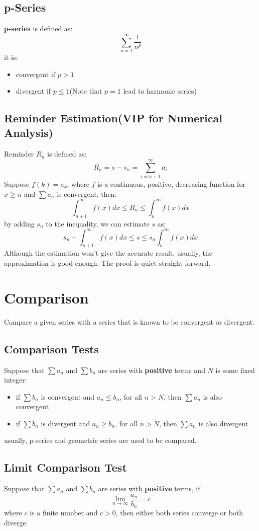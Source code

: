 \documentclass[10pt,a4paper,oneside]{article}
\begin{document}
\subsection{p-Series}
\textbf{p-series} is defined as:
\[
\sum_{n=1}^{\infty} \frac{1}{n^p}
\]
it is:
\begin{itemize}
	\item convergent if $p>1$
	\item divergent if $p \leq 1$(Note that $p=1$ lead to harmonic series)
\end{itemize}

\subsection{Reminder Estimation(VIP for Numerical Analysis)}
Reminder $R_n$ is defined as:
\[
R_n = s - s_n = \sum_{i=n+1}^{\infty} a_i
\]
Suppose $f(k) = a_k$, where  $f$ is a continuous, positive, decreasing function for $x \geq n$ and $\sum a_n$ is convergent, then:
\[
\int_{n+1}^{\infty} f(x) dx \leq R_n \leq \int_{n}^{\infty} f(x)dx
\]
by adding $s_n$ to the inequality, we can estimate $s$ as:
\[
s_n + \int_{n+1}^{\infty} f(x) dx \leq s \leq s_n \int_{n}^{\infty} f(x)dx
\]
Although the estimation won't give the accurate result, usually, the approximation is good enough. The proof is quiet straight forward.

\section{Comparison}
Compare a given series with a series that is known to be convergent or divergent.

\subsection{Comparison Tests}
 Suppose that $\sum a_n$ and $\sum b_n$ are series with \textbf{positive} terms and $N$ is some fixed integer:
\begin{itemize}
	\item if $\sum b_n$ is convergent and $a_n \leq b_n$, for all $n>N$, then $\sum a_n$ is also convergent
	\item if $\sum b_n$ is divergent and $a_n \geq b_n$, for all $n>N$, then $\sum a_n$ is also divergent
\end{itemize}
usually, p-series and geometric series are used to be compared.

\subsection{Limit Comparison Test }
Suppose that $\sum a_n$ and $\sum b_n$ are series with \textbf{positive} terms, if
\[
\lim_{n \rightarrow \infty} \frac{a_n}{b_n} = c
\]
where $c$ is a finite number and $c>0$, then either both series converge or both diverge.
\end{document}
